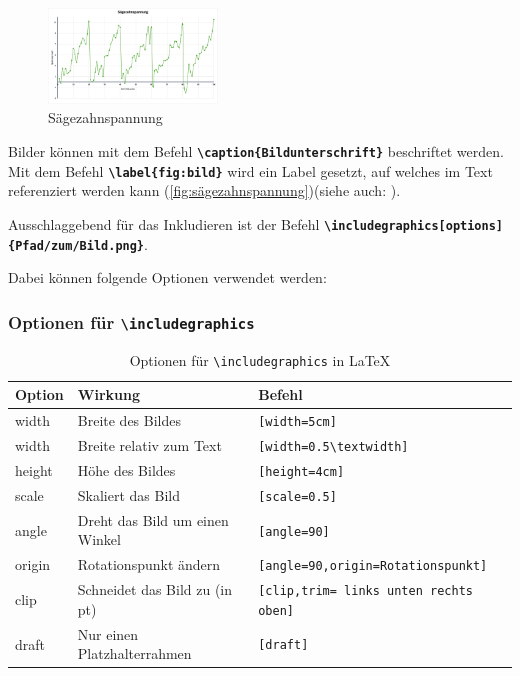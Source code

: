 \begin{figure}[H]
    \centering
    \includegraphics[width=0.4\textwidth]{anlagen/bilder/Graph.png}
    \caption{Sägezahnspannung}
    \label{fig:sägezahnspannung}
\end{figure}

\newpage

Bilder können mit dem Befehl \textbf{\texttt{\textbackslash caption\{Bildunterschrift\}}} beschriftet werden. Mit dem Befehl \textbf{\texttt{\textbackslash label\{fig:bild\}}} wird ein Label gesetzt, auf welches im Text referenziert werden kann (\autoref{fig:sägezahnspannung})(siehe auch: ).

Ausschlaggebend für das Inkludieren ist der Befehl \textbf{\texttt{\textbackslash includegraphics[options]\{Pfad/zum/Bild.png\}}}.

Dabei können folgende Optionen verwendet werden:

\subsubsection{Optionen für \texttt{\textbackslash includegraphics}}
\begin{table}[H]
    \centering
    \begin{tabular}{lll}
        \toprule
        \textbf{Option} & \textbf{Wirkung}               & \textbf{Befehl}                               \\
        \midrule
        width           & Breite des Bildes              & \texttt{[width=5cm]}                          \\
        width           & Breite relativ zum Text        & \texttt{[width=0.5\textbackslash textwidth]}  \\
        height          & Höhe des Bildes                & \texttt{[height=4cm]}                         \\
        scale           & Skaliert das Bild              & \texttt{[scale=0.5]}                          \\
        angle           & Dreht das Bild um einen Winkel & \texttt{[angle=90]}                           \\
        origin          & Rotationspunkt ändern          & \texttt{[angle=90,origin=Rotationspunkt]}     \\
        clip            & Schneidet das Bild zu (in pt)  & \texttt{[clip,trim= links unten rechts oben]} \\
        draft           & Nur einen Platzhalterrahmen    & \texttt{[draft]}                              \\
        \bottomrule
    \end{tabular}
    \caption{Optionen für \texttt{\textbackslash includegraphics} in LaTeX}
    \label{tab:graphics_options}
\end{table}

